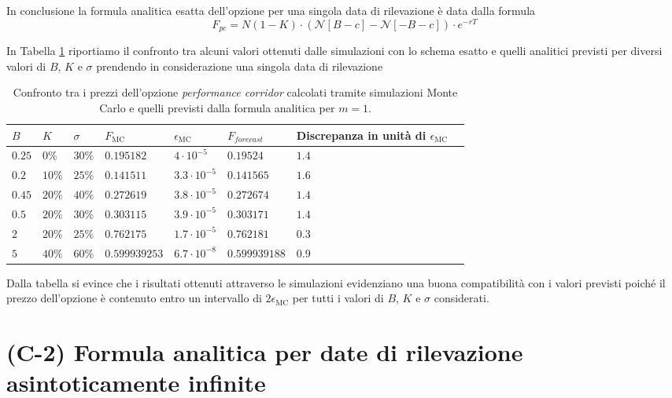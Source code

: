 In conclusione la formula analitica esatta dell'opzione per una singola data di rilevazione è data dalla formula
\begin{equation}
    F_{pc}=N(1-K) \cdot \left(\mathcal{N}[B-c] - \mathcal{N}[-B-c] \right) \cdot e^{-rT}
\end{equation}

In Tabella \ref{tab:Teo-MC_m} riportiamo il confronto tra alcuni valori ottenuti dalle simulazioni con lo schema esatto e quelli analitici previsti per diversi valori di $B$, $K$ e $\sigma$ prendendo in considerazione una singola data di rilevazione

\begin{table}[t]
\small
\centering
\begin{tabular}{|l|l|l|l|l|l|l|l|}
\hline
$B$ & $K$ & $\sigma$ & $F_\text{MC}$ & $\epsilon_\text{MC}$ & $F_{forecast}$ & Discrepanza in unità di $\epsilon_\text{MC}$ \\
\hline \hline
$0.25$ & $0\%$ & $30 \%$ & $0.195182$ & $4 \cdot 10^{-5}$ & $0.19524$ & $1.4$\\ \hline
$0.2$ & $10\%$ & $25\%$ & $0.141511$ & $3.3 \cdot 10^{-5}$ & $0.141565$ & $1.6$\\ \hline
$0.45$ & $20\%$ & $40 \%$ & $0.272619$ & $3.8 \cdot 10^{-5}$ & $0.272674$ & $1.4$\\ \hline
$0.5$ & $20\%$ & $30\%$ & $0.303115$ & $3.9 \cdot 10^{-5}$ & $0.303171$ & $1.4$\\ \hline
$2$ & $20\%$ & $25 \%$ & $0.762175$ & $1.7 \cdot 10^{-5}$ & $0.762181$ & $0.3$\\ \hline
$5$ & $40\%$ & $60 \%$ & $0.599939253$ & $6.7 \cdot 10^{-8}$ & $0.599939188$ & $0.9$\\ \hline
\end{tabular}
\caption{Confronto tra i prezzi dell'opzione \textit{performance corridor} calcolati tramite simulazioni Monte Carlo e quelli previsti dalla formula analitica per $m=1$.}
\label{tab:Teo-MC_m}
\end{table}

Dalla tabella si evince che i risultati ottenuti attraverso le simulazioni evidenziano una buona compatibilità con i valori previsti poiché il prezzo dell'opzione è contenuto entro un intervallo di $2\epsilon_\text{MC}$ per tutti i valori di $B$, $K$ e $\sigma$ considerati.


\section{(C-2) Formula analitica per date di rilevazione asintoticamente infinite}

